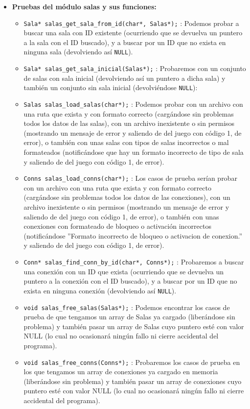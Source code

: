 \begin{itemize}
		\item \textbf{Pruebas del módulo salas y sus funciones:}
		\begin{itemize}

			\item \verb|Sala* salas_get_sala_from_id(char*, Salas*);| : Podemos probar a buscar una sala con ID existente (ocurriendo que se devuelva un puntero a la sala con el ID buscado), y a buscar por un ID que no exista en ninguna sala (devolviendo así \verb|NULL|).
			\item \verb|Sala* salas_get_sala_inicial(Salas*);| : Probaremos con un conjunto de salas con sala inicial (devolviendo así un puntero a dicha sala) y también un conjunto sin sala inicial (devolviéndose \verb|NULL|):
			\item \verb|Salas salas_load_salas(char*);| : Podemos probar con un archivo con una ruta que exista y con formato correcto (cargándose sin problemas todos los datos de las salas), con un archivo inexistente o sin permisos (mostrando un mensaje de error y saliendo de del juego con código 1, de error), o también con unas salas con tipos de salas incorrectos o mal formateados (notificándose que hay un formato incorrecto de tipo de sala y saliendo de del juego con código 1, de error).
			\item \verb|Conns salas_load_conns(char*);| : Los casos de prueba serían probar con un archivo con una ruta que exista y con formato correcto (cargándose sin problemas todos los datos de las conexiones), con un archivo inexistente o sin permisos (mostrando un mensaje de error y saliendo de del juego con código 1, de error), o también con unas conexiones con formateado de bloqueo o activación incorrectos (notificándose ''Formato incorrecto de bloqueo o activacion de conexion.'' y saliendo de del juego con código 1, de error).
			\item \verb|Conn* salas_find_conn_by_id(char*, Conns*);| : Probaremos a buscar una conexión con un ID que exista (ocurriendo que se devuelva un puntero a la conexión con el ID buscado), y a buscar por un ID que no exista en ninguna conexión (devolviendo así \verb|NULL|).
			\item \verb|void salas_free_salas(Salas*);| : Podemos encontrar los casos de prueba de que tengamos un array de Salas ya cargado (liberándose sin problema) y también pasar un array de Salas cuyo puntero esté con valor NULL (lo cual no ocasionará ningún fallo ni cierre accidental del programa).
			\item \verb|void salas_free_conns(Conns*);| : Probaremos los casos de prueba en los que tengamos un array de conexiones ya cargado en memoria (liberándose sin problema) y también pasar un array de conexiones cuyo puntero esté con valor NULL (lo cual no ocasionará ningún fallo ni cierre accidental del programa).

\end{itemize}
\end{itemize}
